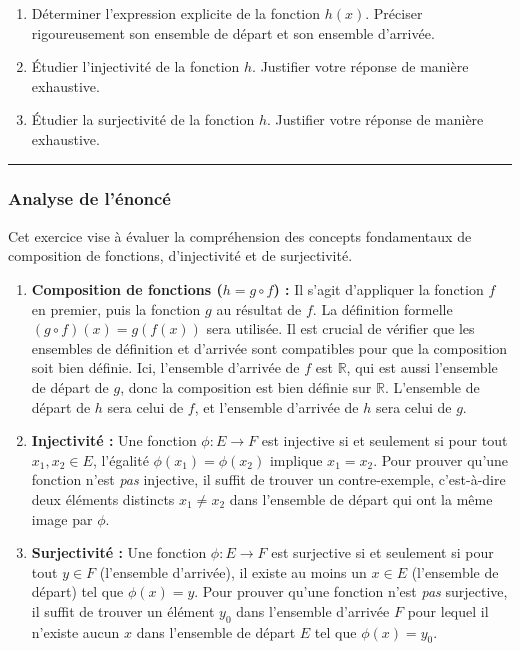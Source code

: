 \documentclass[12pt,a4paper]{report}
\providecommand{\tightlist}{%
  \setlength{\itemsep}{0pt}\setlength{\parskip}{0pt}}
\begin{document}
\begin{enumerate}
\def\labelenumi{\arabic{enumi}.}
\tightlist
\item
  Déterminer l'expression explicite de la fonction \(h(x)\). Préciser
  rigoureusement son ensemble de départ et son ensemble d'arrivée.
\item
  Étudier l'injectivité de la fonction \(h\). Justifier votre réponse de
  manière exhaustive.
\item
  Étudier la surjectivité de la fonction \(h\). Justifier votre réponse
  de manière exhaustive.
\end{enumerate}

\begin{center}\rule{0.5\linewidth}{0.5pt}\end{center}

\subsubsection{Analyse de l'énoncé}\label{analyse-de-luxe9noncuxe9}

Cet exercice vise à évaluer la compréhension des concepts fondamentaux
de composition de fonctions, d'injectivité et de surjectivité.

\begin{enumerate}
\def\labelenumi{\arabic{enumi}.}
\tightlist
\item
  \textbf{Composition de fonctions (\(h = g \circ f\)) :} Il s'agit
  d'appliquer la fonction \(f\) en premier, puis la fonction \(g\) au
  résultat de \(f\). La définition formelle \((g \circ f)(x) = g(f(x))\)
  sera utilisée. Il est crucial de vérifier que les ensembles de
  définition et d'arrivée sont compatibles pour que la composition soit
  bien définie. Ici, l'ensemble d'arrivée de \(f\) est \(\mathbb{R}\),
  qui est aussi l'ensemble de départ de \(g\), donc la composition est
  bien définie sur \(\mathbb{R}\). L'ensemble de départ de \(h\) sera
  celui de \(f\), et l'ensemble d'arrivée de \(h\) sera celui de \(g\).
\item
  \textbf{Injectivité :} Une fonction \(\phi: E \to F\) est injective si
  et seulement si pour tout \(x_1, x_2 \in E\), l'égalité
  \(\phi(x_1) = \phi(x_2)\) implique \(x_1 = x_2\). Pour prouver qu'une
  fonction n'est \emph{pas} injective, il suffit de trouver un
  contre-exemple, c'est-à-dire deux éléments distincts \(x_1 \neq x_2\)
  dans l'ensemble de départ qui ont la même image par \(\phi\).
\item
  \textbf{Surjectivité :} Une fonction \(\phi: E \to F\) est surjective
  si et seulement si pour tout \(y \in F\) (l'ensemble d'arrivée), il
  existe au moins un \(x \in E\) (l'ensemble de départ) tel que
  \(\phi(x) = y\). Pour prouver qu'une fonction n'est \emph{pas}
  surjective, il suffit de trouver un élément \(y_0\) dans l'ensemble
  d'arrivée \(F\) pour lequel il n'existe aucun \(x\) dans l'ensemble de
  départ \(E\) tel que \(\phi(x) = y_0\).
\end{enumerate}
\end{document}
